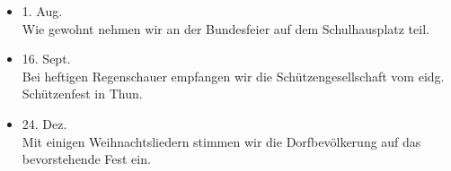 \begin{history}
\begin{itemize}
        \item[]1. Aug.\\
        Wie gewohnt nehmen wir an der Bundesfeier auf dem Schulhausplatz teil.

        \item[]16. Sept.\\
        Bei heftigen Regenschauer empfangen wir die Schützengesellschaft vom
        eidg. Schützenfest in Thun.

        \item[]24. Dez.\\
        Mit einigen Weihnachtsliedern stimmen wir die Dorfbevölkerung auf das
        bevorstehende Fest ein.


    \end{itemize}

\end{history}
